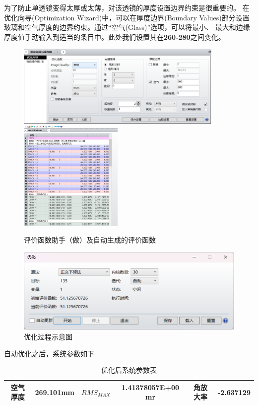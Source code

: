 \documentclass{article}
\begin{document}
为了防止单透镜变得太厚或太薄，对该透镜的厚度设置边界约束是很重要的。
在优化向导(Optimization Wizard)中，可以在厚度边界(Boundary Values)部分设置玻璃和空气厚度的边界约束。通过“空气(Glass)”选项，可以将最小、
最大和边缘厚度值手动输入到适当的条目中。此处我们设置其在\textbf{260-280}之间变化。
        \begin{figure}[H]
            \centering
            \includegraphics[width=10cm]{img/17.png}
            \includegraphics[width=5cm]{img/18.png}
            \caption{评价函数助手（做）及自动生成的评价函数}

            \end{figure}
            \begin{figure}[H]
              \centering
              \includegraphics[width=13cm]{img/22.png}
              \caption{优化过程示意图}
  
              \end{figure}
自动优化之后，系统参数如下
% 
\begin{table}[H]
  \centering
  \begin{tabular}{cccccc}
  \hline
  空气厚度&269.101mm&$RMS_{MAX}$& 1.41378057E+00 mr&角放大率& -2.637129\\ \hline
  \end{tabular}
  \caption{优化后系统参数表}
  \end{table}
\end{document}
